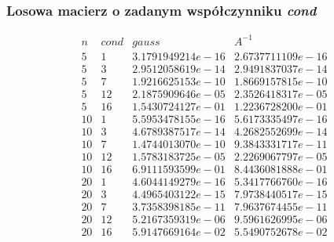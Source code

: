 \subsubsection*{Losowa macierz o zadanym współczynniku \textit{cond}}
$$
\begin{array}{c|c|c|c}
n & \textit{cond} & gauss & A^{-1}\\
\hline
5 & 1 & 3.1791949214e-16 & 2.6737711109e-16 \\
5 & 3 & 2.9512058619e-14 & 2.9491837037e-14 \\
5 & 7 & 1.9216625153e-10 & 1.8669157815e-10 \\
5 & 12 & 2.1875909646e-05 & 2.3526418317e-05 \\
5 & 16 & 1.5430724127e-01 & 1.2236728200e-01 \\
10 & 1 & 5.5953478155e-16 & 5.6173335497e-16 \\
10 & 3 & 4.6789387517e-14 & 4.2682552699e-14 \\
10 & 7 & 1.4744013070e-10 & 9.3843331717e-11 \\
10 & 12 & 1.5783183725e-05 & 2.2269067797e-05 \\
10 & 16 & 6.9111593599e-01 & 8.4436081888e-01 \\
20 & 1 & 4.6044149279e-16 & 5.3417766760e-16 \\
20 & 3 & 4.4965403122e-15 & 7.9738440517e-15 \\
20 & 7 & 3.7358398185e-11 & 7.9637674455e-11 \\
20 & 12 & 5.2167359319e-06 & 9.5961626995e-06 \\
20 & 16 & 5.9147669164e-02 & 5.5490752678e-02 \\
\end{array}
$$
